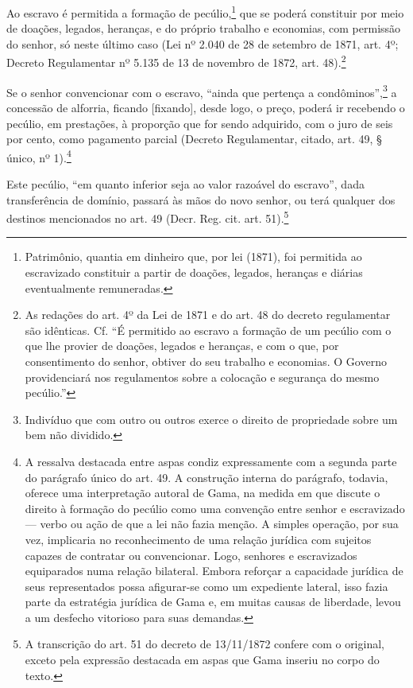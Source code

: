 Ao escravo é permitida a formação de pecúlio,\footnote{Patrimônio,
  quantia em dinheiro que, por lei (1871), foi permitida ao escravizado
  constituir a partir de doações, legados, heranças e diárias
  eventualmente remuneradas.} que se poderá constituir por meio de
doações, legados, heranças, e do próprio trabalho e economias, com
permissão do senhor, só neste último caso (Lei nº 2.040 de 28 de
setembro de 1871, art. 4º; Decreto Regulamentar nº 5.135 de
13 de novembro de 1872, art. 48).\footnote{As redações do art. 4º da
  Lei de 1871 e do art. 48 do decreto regulamentar são idênticas. Cf. ``É
  permitido ao escravo a formação de um pecúlio com o que lhe provier de
  doações, legados e heranças, e com o que, por consentimento do senhor,
  obtiver do seu trabalho e economias. O Governo providenciará nos
  regulamentos sobre a colocação e segurança do mesmo pecúlio.''}

Se o senhor convencionar com o escravo, ``ainda que pertença a
condôminos'',\footnote{Indivíduo que com outro ou outros exerce o
  direito de propriedade sobre um bem não dividido.} a concessão de
alforria, ficando {[}fixando{]}, desde logo, o preço, poderá ir
recebendo o pecúlio, em prestações, à proporção que for sendo adquirido,
com o juro de seis por cento, como pagamento parcial (Decreto
Regulamentar, citado, art. 49, § único, nº
1).\footnote{A ressalva destacada entre aspas condiz expressamente com
  a segunda parte do parágrafo único do art. 49. A construção interna do
  parágrafo, todavia, oferece uma interpretação autoral de Gama,
  na medida em que discute o direito à formação do pecúlio como uma
  convenção entre senhor e escravizado --- verbo ou ação de que a lei não
  fazia menção. A simples operação, por sua vez, implicaria no
  reconhecimento de uma relação jurídica com sujeitos capazes de
  contratar ou convencionar. Logo, senhores e escravizados equiparados
  numa relação bilateral. Embora reforçar a capacidade jurídica de seus
  representados possa afigurar-se como um expediente lateral, isso fazia
  parte da estratégia jurídica de Gama e, em muitas causas de liberdade,
  levou a um desfecho vitorioso para suas demandas.}

Este pecúlio, ``em quanto inferior seja ao valor razoável do escravo'',
dada transferência de domínio, passará às mãos do novo senhor, ou terá
qualquer dos destinos mencionados no art. 49 (Decr. Reg. cit. art.
51).\footnote{A transcrição do art. 51 do decreto de 13/11/1872
  confere com o original, exceto pela expressão destacada em aspas que
  Gama inseriu no corpo do texto.}

